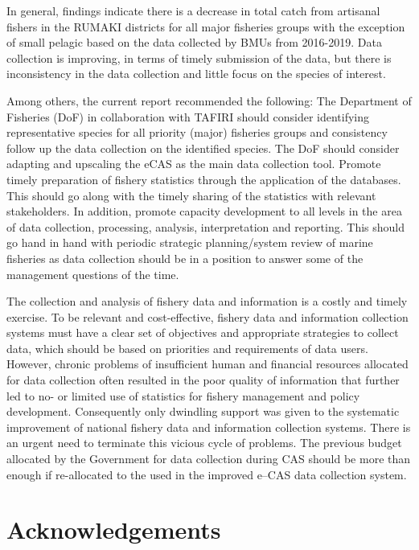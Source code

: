 \documentclass[
  12pt,
  a4paper,
  oneside]{book}
\begin{document}
In general, findings indicate there is a decrease in total catch from artisanal fishers in the RUMAKI districts for all major fisheries groups with the exception of small pelagic based on the data collected by BMUs from 2016-2019. Data collection is improving, in terms of timely submission of the data, but there is inconsistency in the data collection and little focus on the species of interest.

Among others, the current report recommended the following: The Department of Fisheries (DoF)  in collaboration with TAFIRI  should consider identifying representative species for all priority (major) fisheries groups and consistency follow up the data collection on the identified species. The DoF should consider adapting and upscaling the eCAS as the main data collection tool. Promote timely preparation of fishery statistics through the application of the databases. This should go along with the timely sharing of the statistics with relevant stakeholders. In addition, promote capacity development to all levels in the area of data collection, processing, analysis, interpretation and reporting. This should go hand in hand with periodic strategic planning/system review of marine fisheries as data collection should be in a position to answer some of the management questions of the time.

The collection and analysis of fishery data and information is a costly and timely exercise. To be relevant and cost-effective, fishery data and information collection systems must have a clear set of objectives and appropriate strategies to collect data, which should be based on priorities and requirements of data users. However, chronic problems of insufficient human and financial resources allocated for data collection often resulted in the poor quality of information that further led to no- or limited use of statistics for fishery management and policy development. Consequently only dwindling support was given to the systematic improvement of national fishery data and information collection systems. There is an urgent need to terminate this vicious cycle of problems. The previous budget allocated by the Government for data collection during CAS should be more than enough if re-allocated to the used in the improved e--CAS data collection system.

\newpage

\hypertarget{acknowledgements}{%
\section*{Acknowledgements}\label{acknowledgements}}
\end{document}
